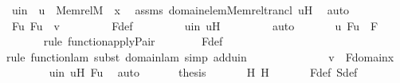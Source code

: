 \begin{isabellebody}
\ uin\ {\isacharcolon}{\kern0pt}\ {\isachardoublequoteopen}u\ {\isasymin}\ Memrel{\isacharparenleft}{\kern0pt}M{\isacharparenright}{\kern0pt}{\isacharcircum}{\kern0pt}{\isacharplus}{\kern0pt}\ {\isacharminus}{\kern0pt}{\isacharbackquote}{\kern0pt}{\isacharbackquote}{\kern0pt}\ {\isacharbraceleft}{\kern0pt}x{\isacharbraceright}{\kern0pt}{\isachardoublequoteclose}\ \isamarkupfalse%
\ assms\ domain{\isacharunderscore}{\kern0pt}elem{\isacharunderscore}{\kern0pt}Memrel{\isacharunderscore}{\kern0pt}trancl\ uH\ \isamarkupfalse%
\ auto\ \isanewline
\ \ \ \ \isamarkupfalse%
\ Fu{\isacharcolon}{\kern0pt}\ {\isachardoublequoteopen}F{\isacharbackquote}{\kern0pt}u\ {\isacharequal}{\kern0pt}\ v{\isachardoublequoteclose}\ \isanewline
\ \ \ \ \ \ \isamarkupfalse%
\ F{\isacharunderscore}{\kern0pt}def\ \isanewline
\ \ \ \ \ \ \isamarkupfalse%
\ uin\ uH\ \isanewline
\ \ \ \ \ \ \isamarkupfalse%
\ auto\ \isanewline
\ \ \ \ \isamarkupfalse%
\ {\isachardoublequoteopen}{\isacharless}{\kern0pt}u{\isacharcomma}{\kern0pt}\ F{\isacharbackquote}{\kern0pt}u{\isachargreater}{\kern0pt}\ {\isasymin}\ F{\isachardoublequoteclose}\ \isanewline
\ \ \ \ \ \ \isamarkupfalse%
{\isacharparenleft}{\kern0pt}rule\ function{\isacharunderscore}{\kern0pt}apply{\isacharunderscore}{\kern0pt}Pair{\isacharparenright}{\kern0pt}\isanewline
\ \ \ \ \ \ \isamarkupfalse%
\ F{\isacharunderscore}{\kern0pt}def\isanewline
\ \ \ \ \ \ \ \isamarkupfalse%
{\isacharparenleft}{\kern0pt}rule\ function{\isacharunderscore}{\kern0pt}lam{\isacharcomma}{\kern0pt}\ subst\ domain{\isacharunderscore}{\kern0pt}lam{\isacharcomma}{\kern0pt}\ simp\ add{\isacharcolon}{\kern0pt}uin{\isacharparenright}{\kern0pt}\isanewline
\ \ \ \ \ \ \isamarkupfalse%
\isanewline
\ \ \ \ \isamarkupfalse%
\ \isamarkupfalse%
\ {\isachardoublequoteopen}v\ {\isasymin}\ F{\isacharbackquote}{\kern0pt}{\isacharbackquote}{\kern0pt}domain{\isacharparenleft}{\kern0pt}x{\isacharparenright}{\kern0pt}{\isachardoublequoteclose}\ \isanewline
\ \ \ \ \ \ \isamarkupfalse%
\ uin\ uH\ Fu\ \isamarkupfalse%
\ auto\isanewline
\ \ \isamarkupfalse%
\isanewline
\isanewline
\ \ \isamarkupfalse%
\ {\isacharquery}{\kern0pt}thesis\ \isanewline
\ \ \ \ \isamarkupfalse%
\ H{}\ H{}\ \isanewline
\ \ \ \ \isamarkupfalse%
\ F{\isacharunderscore}{\kern0pt}def\ S{\isacharunderscore}{\kern0pt}def\ \isanewline

\end{isabellebody}
